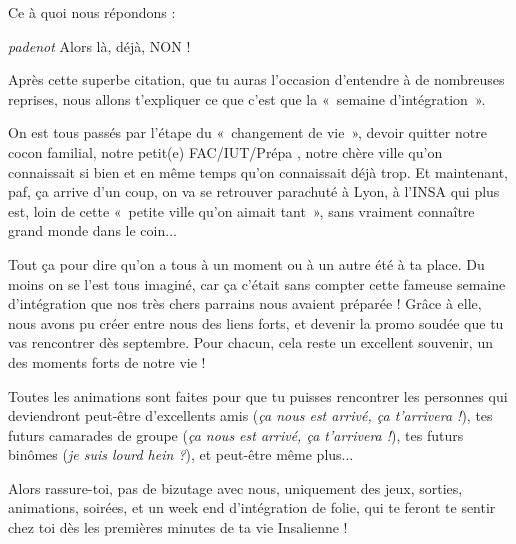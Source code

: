 \vspace{1em}

Ce à quoi nous répondons :

\begin{citationi}{ \emph{padenot} }
    Alors là, déjà, NON !
\end{citationi}

Après cette superbe citation, que tu auras l'occasion d'entendre à de
nombreuses reprises, nous allons t'expliquer ce que c'est que la «~semaine
d'intégration~».

\vspace{1em}

On est tous passés par l'étape du «~changement de vie~», devoir quitter notre
cocon familial, notre petit(e) FAC/IUT/Prépa , notre chère ville qu'on
connaissait si bien et en même temps qu'on connaissait déjà trop.
Et maintenant, paf, ça arrive d'un coup, on va se retrouver parachuté
à Lyon, à l'INSA qui plus est, loin de cette «~petite ville qu'on aimait tant~»,
sans vraiment connaître grand monde dans le coin...

\vspace{1em}

Tout ça pour dire qu'on a tous à un moment ou à un autre été à ta place.
Du moins on se l'est tous imaginé, car ça c'était sans compter cette fameuse
semaine d'intégration que nos très chers parrains nous avaient préparée ! Grâce
à elle, nous avons pu créer entre nous des liens forts, et devenir la promo
soudée que tu vas rencontrer dès septembre. Pour chacun,
cela reste un excellent souvenir, un des moments forts de notre vie !

\vspace{1em}

Toutes les animations sont faites pour que tu puisses rencontrer les
personnes qui deviendront peut-être d'excellents amis (\emph{ça nous est arrivé,
ça t'arrivera !}), tes futurs camarades de groupe (\emph{ça nous est arrivé,
ça t'arrivera !}), tes futurs binômes (\emph{je suis lourd
hein ?}), et peut-être même plus...

\vspace{1em}

Alors rassure-toi, pas de bizutage avec nous, uniquement des jeux,
sorties, animations, soirées, et un week end d'intégration de folie, qui
te feront te sentir chez toi dès les premières minutes de ta vie
Insalienne !

\vspace{1em}

